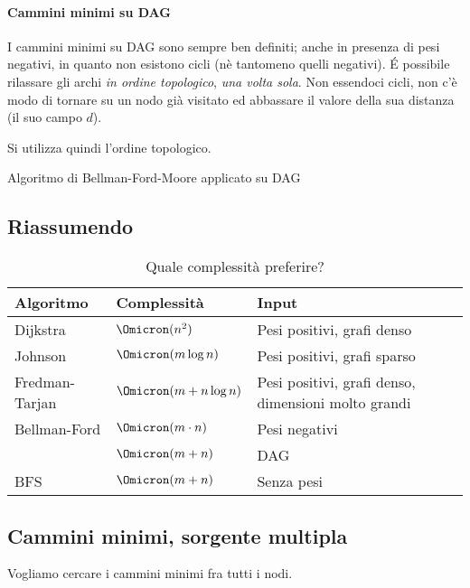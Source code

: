 \paragraph{Cammini minimi su DAG}
I cammini minimi su DAG sono sempre ben definiti;
anche in presenza di pesi negativi, in quanto non esistono cicli (nè tantomeno quelli negativi).
\'E possibile rilassare gli archi \emph{in ordine topologico}, \emph{una volta sola}.
Non essendoci cicli, non c'è modo di tornare su un nodo già visitato ed abbassare il valore della sua distanza (il suo campo \(d\)).

Si utilizza quindi l'ordine topologico.

\begin{algorithm}[H]
	\caption{Algoritmo di Bellman-Ford-Moore applicato su DAG}
	
\end{algorithm}

\subsection{Riassumendo}

\begin{table}[H]\centering
	\caption{Quale complessità preferire?}%
	\label{tab:complexity-compared}
	\begin{tabular}{@{} *{4}{l} @{}}\toprule
			\textbf{Algoritmo} & \textbf{Complessità} & \textbf{Input}\\
		\midrule
			Dijkstra		& \(\Omicron(n^2)\)				& Pesi positivi, grafi denso  \\
		\lightrule
			Johnson			& \(\Omicron(m \log n)\)		& Pesi positivi, grafi sparso \\
		\lightrule
			Fredman-Tarjan	& \(\Omicron(m + n \log n)\)	& Pesi positivi, grafi denso, dimensioni molto grandi \\
		\lightrule
			Bellman-Ford	& \(\Omicron(m \cdot n)\)		& Pesi negativi \\
							& \(\Omicron(m + n)\)			& DAG			\\
						\lightrule
			BFS				& \(\Omicron(m + n)\)			& Senza pesi	\\
		\bottomrule
	\end{tabular}
\end{table}

\subsection{Cammini minimi, sorgente multipla}

Vogliamo cercare i cammini minimi fra tutti i nodi.


